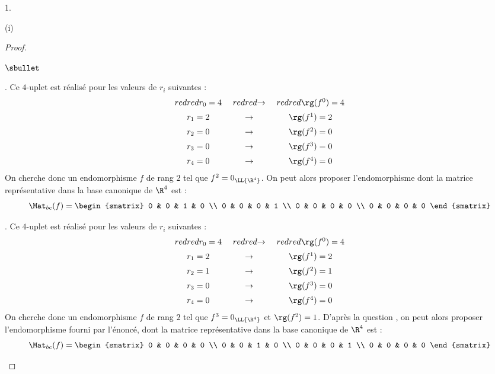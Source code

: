 \documentclass[11pt]{article}%
\begin{document}
\begin{noliste}{1.}
\begin{noliste}{(i)}
\begin{proof}
\begin{noliste}{$\sbullet$}
        \item {}. Ce
          $4$-uplet est réalisé pour les valeurs de $r_i$ suivantes :
          \[
          \begin{array}{c@{\ \quad}c@{\ \quad}c}
            \color{red}{r_0 = 4} & \color{red}{\rightarrow} &
            \color{red}{\rg(f^0) = 4} \\[.2cm] 
            r_1 = 2 & \rightarrow & \rg(f^1) = 2 \\[.2cm]
            r_2 = 0 & \rightarrow & \rg(f^2) = 0 \\[.2cm]
            r_3 = 0 & \rightarrow & \rg(f^3) = 0 \\[.2cm]
            r_4 = 0 & \rightarrow & \rg(f^4) = 0 
          \end{array}
          \]
          On cherche donc un endomorphisme $f$ de rang $2$ tel que
          $f^2 = 0_{\LL{\R^4}}$. On peut alors proposer
          l'endomorphisme dont la matrice représentative dans la base
          canonique de $\R^4$ est :
          \[
          \Mat_{bc}(f) =
          \begin{smatrix}
            0 & 0 & 1 & 0 \\
            0 & 0 & 0 & 1 \\
            0 & 0 & 0 & 0 \\
            0 & 0 & 0 & 0 
          \end{smatrix}
          \]




        \item {}. Ce
          $4$-uplet est réalisé pour les valeurs de $r_i$ suivantes :
          \[
          \begin{array}{c@{\ \quad}c@{\ \quad}c}
            \color{red}{r_0 = 4} & \color{red}{\rightarrow} &
            \color{red}{\rg(f^0) = 4} \\[.2cm] 
            r_1 = 2 & \rightarrow & \rg(f^1) = 2 \\[.2cm]
            r_2 = 1 & \rightarrow & \rg(f^2) = 1 \\[.2cm]
            r_3 = 0 & \rightarrow & \rg(f^3) = 0 \\[.2cm]
            r_4 = 0 & \rightarrow & \rg(f^4) = 0 
          \end{array}
          \]
          On cherche donc un endomorphisme $f$ de rang $2$ tel que
          $f^3 = 0_{\LL{\R^4}}$ et $\rg(f^2) = 1$. D'après la question
          , on peut alors proposer l'endomorphisme fourni par
          l'énoncé, dont la matrice représentative dans la base
          canonique de $\R^4$ est :
          \[
          \Mat_{bc}(f) =
          \begin{smatrix}
            0 & 0 & 0 & 0 \\
            0 & 0 & 1 & 0 \\
            0 & 0 & 0 & 1 \\
            0 & 0 & 0 & 0 
          \end{smatrix}
          \]


\end{noliste}
\end{proof}
\end{noliste}
\end{noliste}
\end{document}
